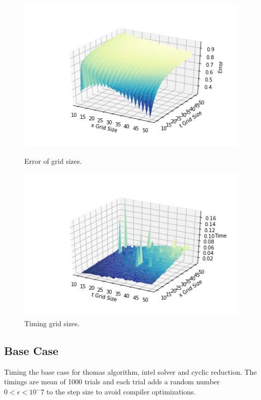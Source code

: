 \documentclass[12pt, oneside]{book}
\theoremstyle{plain}
\theoremstyle{definition}
\begin{document}
\begin{figure}[!htb]
  \begin{minipage}[b]{0.5\textwidth}
    \includegraphics[width=\textwidth]{BSExplicitGridError.png}
    \caption{Error of grid sizes.}
  \end{minipage}
  \begin{minipage}[b]{0.5\textwidth}
    \includegraphics[width=\textwidth]{BSExplicitGridTimer.png}
    \caption{Timing grid sizes.}
  \end{minipage}
\end{figure}

\subsection{Base Case}
Timing the base case for thomas algorithm, intel solver and cyclic reduction. The timings are mean of 1000 trials and each trial adds a random number $ 0 < \epsilon < 10^-7 $ to the step size to avoid compiler optimizations.
\end{document}
